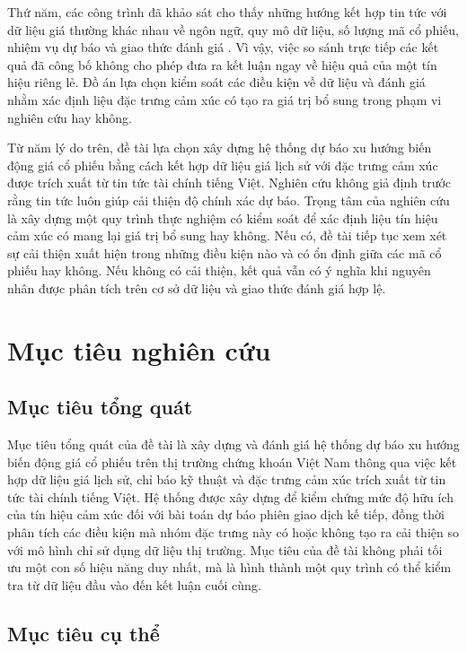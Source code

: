 \documentclass[12pt, a4paper, oneside]{report}
\begin{document}
Thứ năm, các công trình đã khảo sát cho thấy những hướng kết hợp tin tức với dữ liệu
giá thường khác nhau về ngôn ngữ, quy mô dữ liệu, số lượng mã cổ phiếu, nhiệm vụ dự báo
và giao thức đánh giá \cite{Halder2022_221107392v1,Gu2024_240716150v1,
Chen2021_210708721v1,Omranpour2024_241210540v1}. Vì vậy, việc so sánh trực tiếp các
kết quả đã công bố không cho phép đưa ra kết luận ngay về hiệu quả của một tín hiệu
riêng lẻ. Đồ án lựa chọn kiểm soát các điều kiện về dữ liệu và đánh giá nhằm xác định
liệu đặc trưng cảm xúc có tạo ra giá trị bổ sung trong phạm vi nghiên cứu hay không.

Từ năm lý do trên, đề tài lựa chọn xây dựng hệ thống dự báo xu hướng biến động giá cổ
phiếu bằng cách kết hợp dữ liệu giá lịch sử với đặc trưng cảm xúc được trích xuất từ
tin tức tài chính tiếng Việt. Nghiên cứu không giả định trước rằng tin tức luôn giúp
cải thiện độ chính xác dự báo. Trọng tâm của nghiên cứu là xây dựng một quy trình thực
nghiệm có kiểm soát để xác định liệu tín hiệu cảm xúc có mang lại giá trị bổ sung hay
không. Nếu có, đề tài tiếp tục xem xét sự cải thiện xuất hiện trong những điều kiện nào
và có ổn định giữa các mã cổ phiếu hay không. Nếu không có cải thiện, kết quả vẫn có
ý nghĩa khi nguyên nhân được phân tích trên cơ sở dữ liệu và giao thức đánh giá hợp lệ.
\section{Mục tiêu nghiên cứu}
\label{sec:muc-tieu}

\subsection{Mục tiêu tổng quát}

Mục tiêu tổng quát của đề tài là xây dựng và đánh giá hệ thống dự báo xu hướng biến
động giá cổ phiếu trên thị trường chứng khoán Việt Nam thông qua việc kết hợp dữ liệu giá
lịch sử, chỉ báo kỹ thuật và đặc trưng cảm xúc trích xuất từ tin tức tài chính
tiếng Việt. Hệ thống được xây dựng để kiểm chứng mức độ hữu ích của tín hiệu cảm xúc
đối với bài toán dự báo phiên giao dịch kế tiếp, đồng thời phân tích các điều kiện mà nhóm
đặc trưng này có hoặc không tạo ra cải thiện so với mô hình chỉ sử dụng
dữ liệu thị trường. Mục tiêu của đề tài không phải tối ưu một con số hiệu năng duy nhất, mà là hình thành
một quy trình có thể kiểm tra từ dữ liệu đầu vào đến kết luận cuối cùng.

\subsection{Mục tiêu cụ thể}
\end{document}
